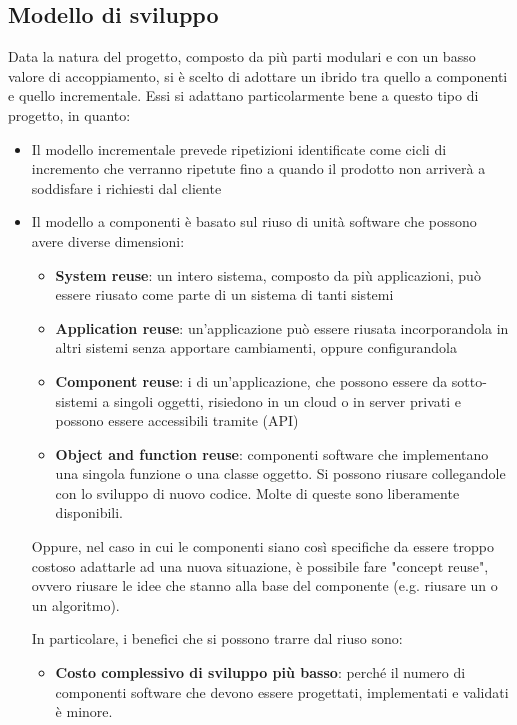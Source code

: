 	\subsection{Modello di sviluppo} %
	Data la natura del progetto, composto da più parti modulari e con un basso valore di accoppiamento, si è scelto di adottare un  ibrido tra quello a componenti e quello incrementale.
	Essi si adattano particolarmente bene a questo tipo di progetto, in quanto:
	\begin{itemize}
		\item Il modello incrementale prevede ripetizioni identificate come cicli di incremento che verranno ripetute fino a quando il prodotto non arriverà a soddisfare i  richiesti dal cliente
		\item Il modello a componenti è basato sul riuso di unità software che possono avere diverse dimensioni:
		\begin{itemize}
			\item \textbf{System reuse}: un intero sistema, composto da più applicazioni, può essere riusato come parte di un sistema di tanti sistemi %
			\item \textbf{Application reuse}: un'applicazione può essere riusata incorporandola in altri sistemi senza apportare cambiamenti, 
				oppure configurandola
			\item \textbf{Component reuse}: i  di un'applicazione, che possono essere da sotto-sistemi a singoli oggetti, risiedono
				in un cloud o in server privati e possono essere accessibili tramite  (API)
			\item \textbf{Object and function reuse}: componenti software che implementano una singola funzione o una classe oggetto. Si 
				possono riusare collegandole con lo sviluppo di nuovo codice. Molte di queste sono liberamente disponibili. 
		\end{itemize}
		Oppure, nel caso in cui le componenti siano così specifiche da essere troppo costoso adattarle ad una nuova situazione,
		è possibile fare "concept reuse", ovvero riusare le idee che stanno alla base del componente (e.g. riusare un  o un algoritmo). \par
		In particolare, i benefici che si possono trarre dal riuso sono:
		\begin{itemize}
			\item \textbf{Costo complessivo di sviluppo più basso}: perché il numero di componenti software che devono essere progettati, implementati e validati è minore.

\end{itemize}
\end{itemize}
